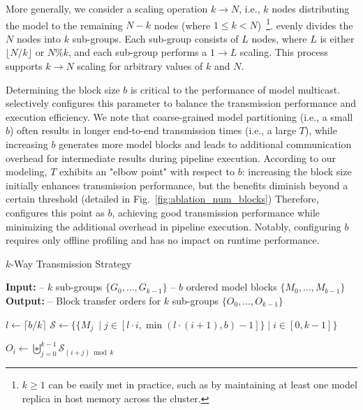 More generally, we consider a scaling operation $k \rightarrow N$, i.e., $k$ nodes distributing the model to the remaining $N - k$ nodes (where $1 \le k < N$)~\footnote{$k \geq 1$ can be easily met in practice, such as by maintaining at least one model replica in host memory across the cluster.}.
\AlgoName evenly divides the $N$ nodes into $k$ sub-groups.
Each sub-group consists of $L$ nodes, where $L$ is either $\lfloor N/k \rfloor$ or $N\%k$, and each sub-group performs a $1 \rightarrow L$ scaling. 
This process supports $k \rightarrow N$ scaling for arbitrary values of $k$ and $N$. 


Determining the block size $b$ is critical to the performance of model multicast.
\AlgoName selectively configures this parameter to balance the transmission performance and execution efficiency.
We note that coarse-grained model partitioning (i.e., a small $b$) often results in longer end-to-end transmission times (i.e., a large $T$), while increasing $b$ generates more model blocks and leads to additional communication overhead for intermediate results during pipeline execution.
According to our modeling, $T$ exhibits an "elbow point" with respect to $b$: increasing the block size initially enhances transmission performance, but the benefits diminish beyond a certain threshold (detailed in Fig.~\ref{fig:ablation_num_blocks})
Therefore, \AlgoName configures this point as $b$, achieving good transmission performance while minimizing the additional overhead in pipeline execution.
Notably, configuring $b$ requires only offline profiling and has no impact on runtime performance.


\begin{algorithm}[tb]
    \caption{$k$-Way Transmission Strategy}
    \small
    \label{alg:k_way}
    \begin{algorithmic}[1]
    \Statex \textbf{Input:}
    \Statex \quad -- $k$ sub-groups $\{G_0, \dots, G_{k-1}\}$
    \Statex \quad -- $b$ ordered model blocks $\{M_0, \dots, M_{b-1}\}$
    \Statex \textbf{Output:}
    \Statex \quad -- Block transfer orders for $k$ sub-groups $\{O_0, \dots, O_{k-1}\}$
    
    \State $l \gets \lceil b / k \rceil$ 
    \State $\mathcal{S} \gets \{ \{M_j\ \mid j \in [l \cdot i , \min (l \cdot (i +1), b) - 1]\}  \mid i \in [0, k-1]\}$ 

     
        \State $O_i \gets \biguplus_{j=0}^{k-1} \mathcal{S}_{(i+j) \bmod k}$
    \EndFor

    \end{algorithmic}
\end{algorithm}

